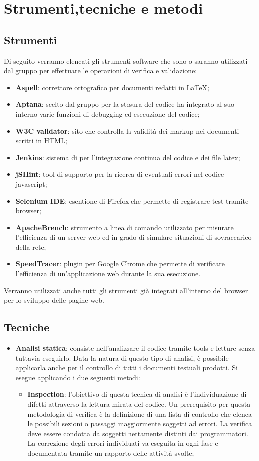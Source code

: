 \section{Strumenti,tecniche e metodi}{
\subsection{Strumenti}{
	\label{sec:strumenti}
	Di seguito verranno elencati gli strumenti software che sono o saranno utilizzati dal gruppo per effettuare le operazioni di verifica e validazione:
	\begin{itemize}
		\item \textbf{Aspell}: correttore ortografico per documenti redatti in \LaTeX;
		\item \textbf{Aptana}: scelto dal gruppo per la stesura del codice ha integrato al suo interno varie funzioni di debugging ed esecuzione del codice;
		\item \textbf{W3C validator}: sito che controlla la validità dei markup nei documenti scritti in HTML;
		\item \textbf{Jenkins}: sistema di per l'integrazione continua del codice e dei file latex;
		\item \textbf{jSHint}: tool di supporto per la ricerca di eventuali errori nel codice javascript;
		\item \textbf{Selenium IDE}: esentione di Firefox che permette di registrare test tramite browser;
		\item \textbf{ApacheBrench}: strumento a linea di comando utilizzato per misurare l’efficienza di un server web ed in grado di simulare situazioni di sovraccarico della rete;
		\item \textbf{SpeedTracer}: plugin per Google Chrome che permette di verificare l’efficienza di un’applicazione web durante la sua esecuzione.
	\end{itemize}
	Verranno utilizzati anche tutti gli strumenti già integrati all'interno del browser per lo sviluppo delle pagine web.
	}
\subsection {Tecniche}{
	\begin{itemize}
		\item \textbf{Analisi statica}: consiste nell’analizzare il codice tramite tools e letture senza tuttavia eseguirlo. Data la natura di questo tipo di analisi, è possibile applicarla anche per il controllo di tutti i documenti testuali prodotti.
		Si esegue applicando i due seguenti metodi:
		\begin{itemize}
			\item \textbf{Inspection}: l’obiettivo di questa tecnica di analisi è l’individuazione di difetti attraverso la lettura mirata del codice. Un prerequisito per questa metodologia di verifica è la definizione di una lista di controllo che elenca le possibili sezioni o passaggi maggiormente soggetti ad errori. La verifica deve essere condotta da soggetti nettamente distinti dai programmatori. La correzione degli errori individuati va eseguita in ogni fase e documentata tramite un rapporto delle attività svolte;
			

\end{itemize}
\end{itemize}}}
